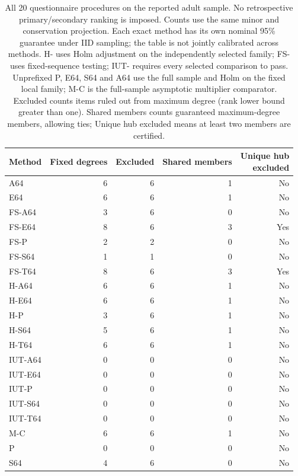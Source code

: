 \begin{table}[htbp]\centering\small
\caption{All 20 questionnaire procedures on the reported adult sample. No retrospective primary/secondary ranking is imposed. Counts use the same minor and conservation projection. Each exact method has its own nominal 95\% guarantee under IID sampling; the table is not jointly calibrated across methods. H- uses Holm adjustment on the independently selected family; FS- uses fixed-sequence testing; IUT- requires every selected comparison to pass. Unprefixed P, E64, S64 and A64 use the full sample and Holm on the fixed local family; M-C is the full-sample asymptotic multiplier comparator. Excluded counts items ruled out from maximum degree (rank lower bound greater than one). Shared members counts guaranteed maximum-degree members, allowing ties; Unique hub excluded means at least two members are certified.}\label{tab:rse-methods}
\begin{tabular}{lrrrr}\toprule
Method & Fixed degrees & Excluded & Shared members & \shortstack{Unique hub\\excluded}\\\midrule
A64 & 6 & 6 & 1 & No\\
E64 & 6 & 6 & 1 & No\\
FS-A64 & 3 & 6 & 0 & No\\
FS-E64 & 8 & 6 & 3 & Yes\\
FS-P & 2 & 2 & 0 & No\\
FS-S64 & 1 & 1 & 0 & No\\
FS-T64 & 8 & 6 & 3 & Yes\\
H-A64 & 6 & 6 & 1 & No\\
H-E64 & 6 & 6 & 1 & No\\
H-P & 3 & 6 & 1 & No\\
H-S64 & 5 & 6 & 1 & No\\
H-T64 & 6 & 6 & 1 & No\\
IUT-A64 & 0 & 0 & 0 & No\\
IUT-E64 & 0 & 0 & 0 & No\\
IUT-P & 0 & 0 & 0 & No\\
IUT-S64 & 0 & 0 & 0 & No\\
IUT-T64 & 0 & 0 & 0 & No\\
M-C & 6 & 6 & 1 & No\\
P & 0 & 0 & 0 & No\\
S64 & 4 & 6 & 0 & No\\
\bottomrule\end{tabular}\end{table}
